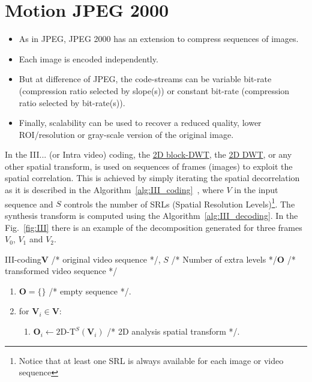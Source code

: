 \section{Motion JPEG 2000}
\begin{itemize}
\item As in JPEG, JPEG 2000 has an extension \cite{j2k-part3} to
  compress sequences of images.
\item Each image is encoded independently.
\item But at difference of JPEG, the code-streams can be variable
  bit-rate (compression ratio selected by slope(s)) or constant
  bit-rate (compression ratio selected by bit-rate(s)).
\item Finally, scalability can be used to recover a reduced quality,
  lower ROI/resolution or gray-scale version of the original image. 
\end{itemize}
\begin{center}
\end{center}

In the III... (or Intra video) coding, the
\href{https://sistemas-multimedia.github.io/milestones/07-DCT/}{2D
  block-DWT}, the
\href{https://sistemas-multimedia.github.io/milestones/08-DWT/}{2D
  DWT}, or any other spatial transform, is used on sequences of frames
(images) to exploit the spatial correlation. This is achieved by
simply iterating the spatial decorrelation as it is described in the
Algorithm~\ref{alg:III_coding}~\cite{taubman2002jpeg2000}, where $V$
in the input sequence and $S$ controls the number of SRLs (Spatial
Resolution Levels)\footnote{Notice that at least one SRL is always
available for each image or video sequence}. The synthesis transform
is computed using the Algorithm~\ref{alg:III_decoding}. In the
Fig.~\ref{fig:III} there is an example of the decomposition generated
for three frames $V_0$, $V_1$ and $V_2$.

\begin{myalg}{III-coding}{$\mathbf{V}$ /* original video sequence */, $S$ /* Number of extra levels */}{$\mathbf{O}$ /* transformed video sequence */}
  \label{alg:III_coding}
  \begin{enumerate}
  \item ${\mathbf O}=\{\}$ /* empty sequence */.
  \item for ${\mathbf V}_i\in {\mathbf V}$:
    \begin{enumerate}
    \item ${\mathbf O}_i\leftarrow\text{2D-T}^{S}({\mathbf V}_i)$ /* 2D analysis spatial transform */.
    \end{enumerate}
  \end{enumerate}
\end{myalg}

